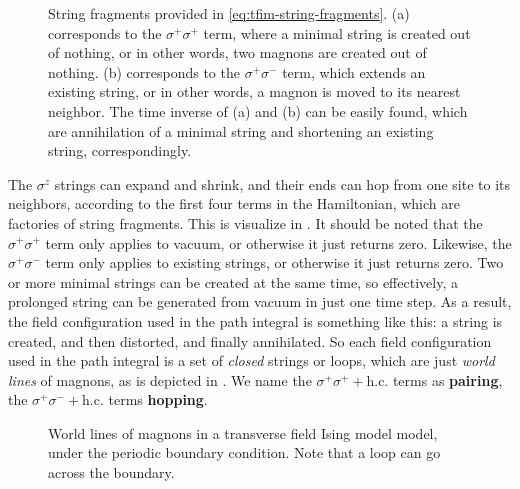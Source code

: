 \documentclass[hyperref, a4paper]{article}
\newcommand*{\concept}[1]{{\textbf{#1}}}
\newcommand*{\tfim}{transverse field Ising model}
\begin{document}
\begin{figure}
    \centering
    \begin{subfigure}{0.48\textwidth}
        
        \subcaption{}
    \end{subfigure}
    \begin{subfigure}{0.48\textwidth}
        
        \subcaption{}
    \end{subfigure}
    \caption{String fragments provided in \eqref{eq:tfim-string-fragments}. 
    (a) corresponds to the $\sigma^+ \sigma^+$ term, where a minimal string is created out of nothing, 
    or in other words, two magnons are created out of nothing.
    (b) corresponds to the $\sigma^+ \sigma^-$ term, which extends an existing string, 
    or in other words, a magnon is moved to its nearest neighbor. 
    The time inverse of (a) and (b) can be easily found, which are annihilation of a minimal string and shortening an existing string, correspondingly.}
    \label{fig:tfim-string-fragments}
\end{figure}

The $\sigma^z$ strings can expand and shrink, and their ends can hop from one site to its neighbors, 
according to the first four terms in the Hamiltonian, which are factories of string fragments.
This is visualize in .
It should be noted that the $\sigma^+ \sigma^+$ term only applies to vacuum, or otherwise it just returns zero.
Likewise, the $\sigma^+ \sigma^-$ term only applies to existing strings, or otherwise it just returns zero.
Two or more minimal strings can be created at the same time, 
so effectively, a prolonged string can be generated from vacuum in just one time step.
As a result, the field configuration used in the path integral is something like this: 
a string is created, and then distorted, and finally annihilated.
So each field configuration used in the path integral is a set of \emph{closed} strings or loops, 
which are just \emph{world lines} of magnons, as is depicted in .
We name the $\sigma^+ \sigma^+ + \text{h.c.}$ terms as \concept{pairing}, the $\sigma^+ \sigma^- + \text{h.c.}$ terms \concept{hopping}.

\begin{figure}
    \centering
    
    \caption{World lines of magnons in a \tfim{} model, under the periodic boundary condition. Note that a loop can go across the boundary.}
    \label{fig:tfim-worldline}
\end{figure}
\end{document}
